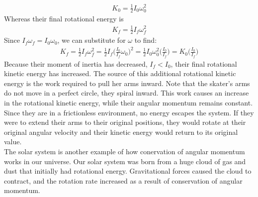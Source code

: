 \documentclass[a4paper]{article}
\begin{document}
\begin{align*}
    K_0 = \frac{1}{2}I_0\omega_0^2
\end{align*}
Whereas their final rotational energy is
\begin{align*}
    K_f = \frac{1}{2}I_f\omega_f^2
\end{align*}
Since $I_f\omega_f = I_0\omega_0$, we can substitute for $\omega$ to find:
\begin{align*}
    K_f = \frac{1}{2}I_f\omega_f^2 = \frac{1}{2}I_f\bigg(\frac{I_0}{I_f}\omega_0\bigg)^2 = \frac{1}{2}I_0\omega_0^2\bigg(\frac{I_0}{I_f}\bigg) = K_0\bigg(\frac{I_0}{I_f}\bigg)
\end{align*}
Because their moment of inertia has decreased, $I_f < I_0$, their final rotational kinetic energy has increased. The source of this additional rotational kinetic energy is the work required to pull her arms inward. Note that the skater's arms do not move in a perfect circle, they spiral inward. This work causes an increase in the rotational kinetic energy, while their angular momentum remains constant. Since they are in a frictionless environment, no energy escapes the system. If they were to extend their arms to their original positions, they would rotate at their original angular velocity and their kinetic energy would return to its original value.
\vspace{1mm}\\
The solar system is another example of how conervation of angular momentum works in our universe. Our solar system was born from a huge cloud of gas and dust that initially had rotational energy. Gravitational forces caused the cloud to contract, and the rotation rate increased as a result of conservation of angular momentum.
\end{document}
